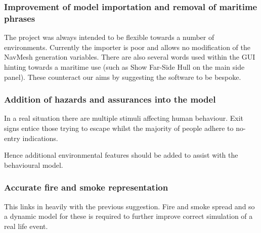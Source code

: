 \subsubsection*{Improvement of model importation and removal of maritime phrases}

The project was always intended to be flexible towards a number of
environments. Currently the importer is poor and allows no modification
of the NavMesh generation variables. There are also several words
used within the GUI hinting towards a maritime use (such as Show Far-Side
Hull on the main side panel). These counteract our aims by suggesting
the software to be bespoke.


\subsubsection*{Addition of hazards and assurances into the model}

In a real situation there are multiple stimuli affecting human behaviour.
Exit signs entice those trying to escape whilst the majority of people
adhere to no-entry indications.

Hence additional environmental features should be added to assist
with the behavioural model.


\subsubsection*{Accurate fire and smoke representation}

This links in heavily with the previous suggestion. Fire and smoke
spread and so a dynamic model for these is required to further improve
correct simulation of a real life event.

